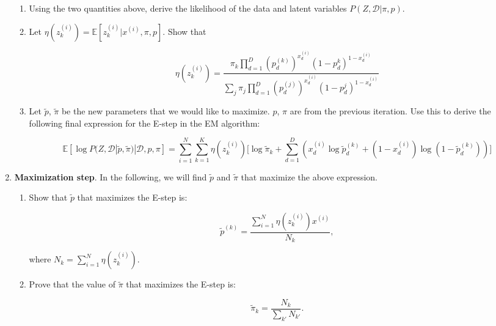 \begin{Q}
\begin{enumerate}
\begin{enumerate}
\item Using the two quantities above, derive the likelihood of the data and latent variables $P(Z,\mathcal{D}|\pi, p)$.

\item Let $\eta(z_{k}^{(i)}) = \mathbb{E} [z_{k}^{(i)}| x^{(i)}, \pi, p  ]$. Show that 

$$
\eta(z_{k}^{(i)})  = \frac{\pi_{k}  \prod_{d=1}^{D} (p_{d}^{(k)})^{x_{d}^{(i)} } (1-p_{d}^{k})^{1-x_{d}^{(i)}}  }{ \sum_{j}  \pi_{j}  \prod_{d=1}^{D} (p_{d}^{(j)})^{x_{d}^{(i)} } (1-p_{d}^{j})^{1-x_{d}^{(i)}}   }
$$

\item Let $\tilde{p}$, $\tilde{\pi}$ be the new parameters that we would like to maximize. $p$, $\pi$ are from the previous iteration. Use this to derive the following final expression for the E-step in the EM algorithm:

$$
\mathbb{E}[\log P(Z, \mathcal{D} | \tilde{ p}, \tilde{\pi}  ) | \mathcal{D} , p, \pi    ] = \sum_{i=1}^{N} \sum_{k=1}^{K} \eta(z_{k}^{(i)}) \Big[ \log{\tilde{\pi}_{k} } + \sum_{d=1}^{D} (  x_{d}^{(i)} \log \tilde{p}_{d}^{(k)}+ (1-x_{d}^{(i)}) \log(1-  \tilde{p}_{d}^{(k)}  )  )   \Big]
$$
\end{enumerate}


\item  \textbf{Maximization step}. In the following, we will find $\tilde{p}$ and $\tilde{\pi}$ that maximize the above expression. 
\begin{enumerate}
\item Show that $\tilde{p}$ that maximizes the E-step is:

$$
\tilde{p}^{(k)} = \frac{  \sum_{i=1}^{N} \eta(z_{k}^{(i)} ) x^{(i)}   }{N_k},
$$

where $N_{k} = \sum_{i=1}^{N} \eta( z_{k}^{(i)} )$.

\item Prove that the value of $\tilde{\pi}$ that maximizes the E-step is:

$$
\tilde{\pi}_{k} = \frac{N_{k}}{ \sum_{k'} N_{k'} }.
$$


\end{enumerate}

\end{enumerate}
\end{Q}
          